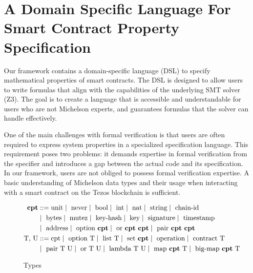 \documentclass[a4paper,USenglish,cleveref, autoref, thm-restate]{lipics-v2021}
\begin{document}
\section{A Domain Specific Language For Smart Contract Property Specification}
\label{sec:domain-specific-language}

Our framework contains a domain-specific language (DSL) to specify
mathematical properties of smart contracts.
The DSL is designed to allow users to write formulas that align with
the capabilities of the underlying SMT solver (Z3).
The goal is to create a language
that is accessible and understandable for users who are
not Michelson experts, and guarantees formulas that the solver can handle effectively.



One of the main challenges with formal verification is that users are
often required to express  system properties in a specialized
specification language. This requirement poses two problems: it
demands expertise in formal verification from the specifier and
introduces a gap between the actual code and its specification. In our
framework, users are not obliged to possess formal verification
expertise. A basic understanding of Michelson data types and their
usage when interacting with a smart contract on the Tezos blockchain
is sufficient.
\begin{figure}[tp]
\begin{align*}
\textbf{cpt} &::= 
   \text{unit} 
   \mid\ \text{never} 
   \mid\ \text{bool} 
   \mid\ \text{int}
   \mid\ \text{nat}
   \mid\ \text{string}
   \mid\ \text{chain-id} \\
   & \mid\ \text{bytes}
   \mid\ \text{mutez} 
   \mid\ \text{key-hash}
   \mid\ \text{key}
   \mid\ \text{signature}
   \mid\ \text{timestamp} \\
   & \mid\ \text{address} 
   \mid\ \text{option}\ \textbf{cpt}
   \mid\ \text{or}\ \textbf{cpt}\ \textbf{cpt}
   \mid\ \text{pair}\ \textbf{cpt}\ \textbf{cpt} \\
\text{T, U} &::= 
    \text{cpt}
   \mid\ \text{option}\ \text{T}
   \mid\ \text{list}\ \text{T}
   \mid\ \text{set}\ \textbf{cpt} 
   \mid\ \text{operation} 
   \mid\ \text{contract}\ \text{T} \\
  & \mid\ \text{pair}\ \text{T}\ \text{U}
   \mid\ \text{or}\ \text{T}\ \text{U}
   \mid\ \text{lambda}\ \text{T}\ \text{U} 
   \mid\ \text{map}\ \textbf{cpt}\ \text{T}
   \mid\ \text{big-map}\ \textbf{cpt}\ \text{T}
\end{align*}
\caption{Types}
\label{fig:types}
\end{figure}
\end{document}
